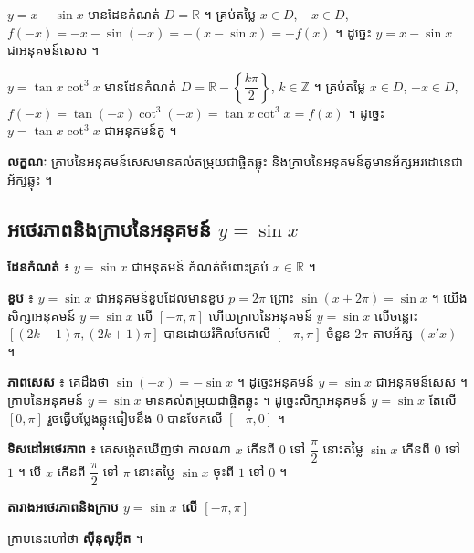 \begin{example}[ឧទាហរណ៍]
$y = x - \sin x$ មានដែនកំណត់ $D = \mathbb{R}$ ។ គ្រប់តម្លៃ $x \in D$, $-x \in D$, $f(-x) = -x - \sin(-x) = -(x - \sin x) = -f(x)$ ។ ដូច្នេះ $y = x - \sin x$ ជាអនុគមន៍សេស ។

$y = \tan x\cot^3 x$ មានដែនកំណត់ $D = \mathbb{R} - \left\{\dfrac{k\pi}{2}\right\}$, $k \in \mathbb{Z}$ ។ គ្រប់តម្លៃ $x \in D$, $-x \in D$, $f(-x) = \tan(-x)\cot^3(-x) = \tan x\cot^3 x = f(x)$ ។ ដូច្នេះ $y = \tan x\cot^3 x$ ជាអនុគមន៍គូ ។
\end{example}

\textbf{លក្ខណៈ} ក្រាបនៃអនុគមន៍សេសមានគល់តម្រុយជាផ្ចិតឆ្លុះ និងក្រាបនៃអនុគមន៍គូមានអ័ក្សអរដោនេជាអ័ក្សឆ្លុះ ។

\subsection{អថេរភាពនិងក្រាបនៃអនុគមន៍ \texorpdfstring{$y = \sin x$}{y = sin x}}

\textbf{ដែនកំណត់} ៖ $y = \sin x$ ជាអនុគមន៍ កំណត់ចំពោះគ្រប់ $x \in \mathbb{R}$ ។

\textbf{ខួប} ៖ $y = \sin x$ ជាអនុគមន៍ខួបដែលមានខួប $p = 2\pi$ ព្រោះ $\sin(x + 2\pi) = \sin x$ ។ យើងសិក្សាអនុគមន៍ $y = \sin x$ លើ $[-\pi, \pi]$ ហើយក្រាបនៃអនុគមន៍ $y = \sin x$ លើចន្លោះ $[(2k - 1)\pi, (2k + 1)\pi]$ បានដោយរំកិលមែកលើ $[-\pi, \pi]$ ចំនួន $2\pi$ តាមអ័ក្ស $(x'x)$ ។

\textbf{ភាពសេស} ៖ គេដឹងថា $\sin(-x) = -\sin x$ ។ ដូច្នេះអនុគមន៍ $y = \sin x$ ជាអនុគមន៍សេស ។ ក្រាបនៃអនុគមន៍ $y = \sin x$ មានគល់តម្រុយជាផ្ចិតឆ្លុះ ។ ដូច្នេះសិក្សាអនុគមន៍ $y = \sin x$ តែលើ $[0, \pi]$ រួចធ្វើបម្លែងឆ្លុះធៀបនឹង $0$ បានមែកលើ $[-\pi, 0]$ ។

\textbf{ទិសដៅអថេរភាព} ៖ គេសង្កេតឃើញថា កាលណា $x$ កើនពី $0$ ទៅ $\dfrac{\pi}{2}$ នោះតម្លៃ $\sin x$ កើនពី $0$ ទៅ $1$ ។ បើ $x$ កើនពី $\dfrac{\pi}{2}$ ទៅ $\pi$ នោះតម្លៃ $\sin x$ ចុះពី $1$ ទៅ $0$ ។

\textbf{តារាងអថេរភាពនិងក្រាប $y = \sin x$ លើ $[-\pi, \pi]$}
\begin{center}

\end{center}
ក្រាបនេះហៅថា \textbf{ស៊ីនុសូអ៊ីត} ។

